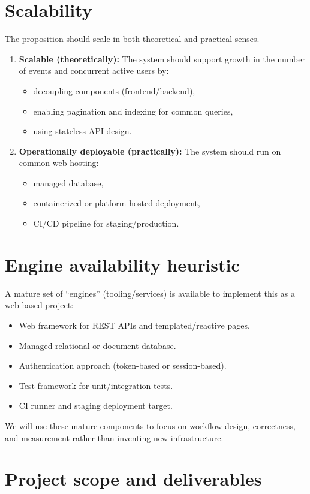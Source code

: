 \documentclass[12pt, a4paper]{article}
\begin{document}
\section{Scalability} 
The proposition should scale in both theoretical and practical senses.
\begin{enumerate}
    \item \textbf{Scalable (theoretically):} The system should support growth in the number of events and concurrent active users by:
    \begin{itemize}
        \item decoupling components (frontend/backend),
        \item enabling pagination and indexing for common queries,
        \item using stateless API design.
    \end{itemize}
    \item \textbf{Operationally deployable (practically):} The system should run on common web hosting:
    \begin{itemize}
        \item managed database,
        \item containerized or platform-hosted deployment,
        \item CI/CD pipeline for staging/production.
    \end{itemize}
\end{enumerate}

\section{Engine availability heuristic} 
A mature set of ``engines'' (tooling/services) is available to implement this as a web-based project:
\begin{itemize}
    \item Web framework for REST APIs and templated/reactive pages.
    \item Managed relational or document database.
    \item Authentication approach (token-based or session-based).
    \item Test framework for unit/integration tests.
    \item CI runner and staging deployment target.
\end{itemize}
We will use these mature components to focus on workflow design, correctness, and measurement rather than inventing new infrastructure.

\section{Project scope and deliverables} 
\end{document}
